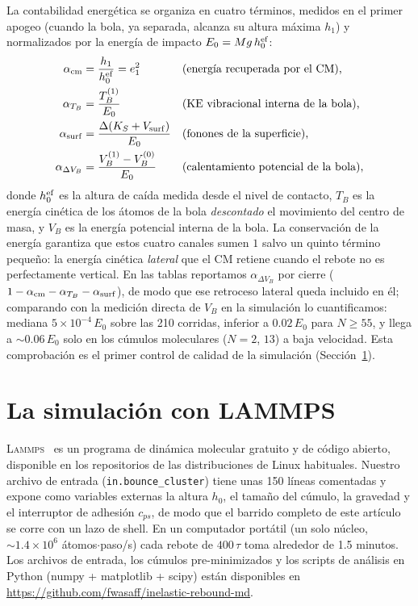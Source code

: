 \documentclass[10pt,a4paper,twocolumn]{article}
\newcommand{\lammps}{\textsc{Lammps}}
\begin{document}
La contabilidad energética se organiza en cuatro términos, medidos en el
primer apogeo (cuando la bola, ya separada, alcanza su altura máxima
$h_1$) y normalizados por la energía de impacto $E_0=Mg\,h_0^{\rm ef}$:
\begin{align}
    \alpha_{\rm cm}     &= \frac{h_1}{h_0^{\rm ef}} = e_1^2
        &&\text{(energía recuperada por el CM),} \label{eq:acm}\\
    \alpha_{T_B}        &= \frac{T_B^{(1)}}{E_0}
        &&\text{(KE vibracional interna de la bola),} \label{eq:atb}\\
    \alpha_{\rm surf}   &= \frac{\Delta(K_S + V_{\rm surf})}{E_0}
        &&\text{(fonones de la superficie),} \label{eq:asurf}\\
    \alpha_{\Delta V_B} &= \frac{V_B^{(1)}-V_B^{(0)}}{E_0}
        &&\text{(calentamiento potencial de la bola),} \label{eq:avb}
\end{align}
donde $h_0^{\rm ef}$ es la altura de caída medida desde el nivel de
contacto, $T_B$ es la energía cinética de los átomos de la bola
\emph{descontado} el movimiento del centro de masa, y $V_B$ es la energía
potencial interna de la bola. La conservación de la energía garantiza que
estos cuatro canales sumen $1$ salvo un quinto término pequeño: la energía
cinética \emph{lateral} que el CM retiene cuando el rebote no es
perfectamente vertical. En las tablas reportamos $\alpha_{\Delta V_B}$ por
cierre ($1-\alpha_{\rm cm}-\alpha_{T_B}-\alpha_{\rm surf}$), de modo que ese
retroceso lateral queda incluido en él; comparando con la medición directa
de $V_B$ en la simulación lo cuantificamos: mediana $5\times10^{-4}\,E_0$
sobre las 210 corridas, inferior a $0.02\,E_0$ para $N\ge55$, y llega a
$\sim0.06\,E_0$ solo en los cúmulos moleculares ($N=2$, $13$) a baja
velocidad. Esta comprobación es el primer control de calidad de la
simulación (Sección~\ref{sec:metodos}).

\section{La simulación con LAMMPS}
\label{sec:metodos}

\lammps{}~\cite{Thompson2022} es un programa de dinámica molecular
gratuito y de código abierto, disponible en los repositorios de las
distribuciones de Linux habituales. Nuestro archivo de entrada
(\texttt{in.bounce\_cluster}) tiene unas 150 líneas comentadas y expone
como variables externas la altura $h_0$, el tamaño del cúmulo, la gravedad
y el interruptor de adhesión $c_{ps}$, de modo que el barrido completo de
este artículo se corre con un lazo de shell. En un computador portátil
(un solo núcleo, $\sim1.4\times10^6$ átomos$\cdot$paso/s) cada rebote de
$400\,\tau$ toma alrededor de 1.5 minutos. Los archivos de entrada, los
cúmulos pre-minimizados y los scripts de análisis en Python (numpy +
matplotlib + scipy) están disponibles en
\url{https://github.com/fwasaff/inelastic-rebound-md}.
\end{document}
